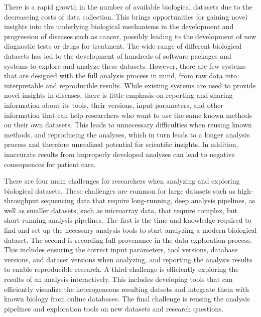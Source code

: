 There is a rapid growth in the number of available biological datasets due to
the decreaseing costs of data collection. This brings opportunities for gaining
novel insights into the underlying biological mechanisms in the development and
progression of diseases such as cancer, possibly leading to the development of
new diagnostic tests or drugs for treatment.  The wide range of different
biological datasets has led to the development of hundreds of software packages
and systems to explore and analyze these datasets.  However, there are few
systems that are designed with the full analysis process in mind, from raw data
into interpretable and reproducible results.  While existing systems are used to
provide novel insights in diseases, there is little emphasis on reporting and
sharing information about its tools, their versions, input parameters, and other
information that can help researchers who want to use the same known methods on
their own datasets. This leads to unnecessary difficulties when reusing known
methods, and reproducing the analyses, which in turn leads to a longer analysis
process and therefore unrealized potential for scientific insights. In addition,
inaccurate results from improperly developed analyses can lead to negative
consequences for patient care.\cite{roy2017standards}

There are four main challenges for researchers when analyzing and exploring
biological datasets. These challenges are common for large datasets such as
high-throughput sequencing data that require long-running, deep analysis
pipelines, as well as smaller datasets, such as microarray data, that require
complex, but short-running analysis pipelines. The first is the time and
knowledge required to find and set up the necessary analysis tools to start
analyzing a modern biological dataset. The second is recording full provenance
in the data exploration process. This includes ensuring the correct input
parameters, tool versions, database versions, and dataset versions when
analyzing, and reporting the analysis results to enable reproducible research. A
third challenge is efficiently exploring the results of an analysis
interactively. This includes developing tools that can efficiently visualize the
heterogeneous resulting datsets and integrate them with known biology from
online databases. The final challenge is reusing the analysis pipelines and
exploration tools on new datasets and research questions. 

